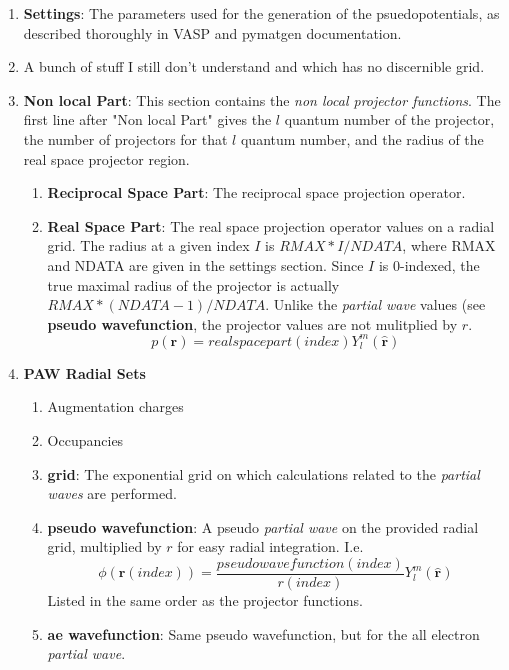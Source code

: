 \documentclass[12pt]{article}
\begin{document}
\begin{enumerate}
	\item
	\textbf{Settings}: The parameters used for the generation of the psuedopotentials,
	as described thoroughly in VASP and pymatgen documentation.
	\item
	A bunch of stuff I still don't understand and which has no discernible grid.
	\item
	\textbf{Non local Part}: This section contains the \emph{non local projector functions}.
	The first line after "Non local Part" gives the $l$ quantum number of the projector,
	the number of projectors for that $l$ quantum number, and the radius of the real
	space projector region.
	\begin{enumerate}
		\item
		\textbf{Reciprocal Space Part}: The reciprocal space projection operator.
		\item
		\textbf{Real Space Part}: The real space projection operator values on a radial
		grid. The radius at a given index $I$ is $RMAX*I/NDATA$, where RMAX and NDATA
		are given in the settings section. Since $I$ is 0-indexed, the true maximal
		radius of the projector is actually $RMAX*(NDATA-1)/NDATA$. Unlike the
		\emph{partial wave} values (see \textbf{pseudo wavefunction},
		the projector values are not mulitplied by $r$.
		$$p(\mathbf{r})=realspacepart(index)Y_l^m(\hat{\mathbf{r}})$$
	\end{enumerate}
	\item
	\textbf{PAW Radial Sets}
	\begin{enumerate}
		\item
		Augmentation charges
		\item
		Occupancies
		\item
		\textbf{grid}: The exponential grid on which calculations related
		to the \emph{partial waves} are performed.
		\item
		\textbf{pseudo wavefunction}: A pseudo \emph{partial wave} on the provided
		radial grid, multiplied by $r$ for easy radial integration. I.e.
		$$\phi(\mathbf{r}(index))=\frac{pseudowavefunction(index)}{r(index)}Y_l^m(\hat{\mathbf{r}})$$
		Listed in the same order as the projector functions.
		\item
		\textbf{ae wavefunction}: Same pseudo wavefunction, but for the all electron \emph{partial wave}.
	\end{enumerate}
\end{enumerate}

\subsection*{}

\printbibliography
\end{document}
